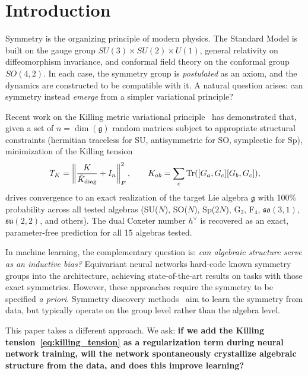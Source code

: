 \documentclass[11pt,a4paper]{article}
\newcommand{\fkg}{\mathfrak{g}}
\newcommand{\fksu}{\mathfrak{su}}
\newcommand{\fkso}{\mathfrak{so}}
\newcommand{\TK}{T_K}
\newcommand{\hdual}{h^{\vee}}
\theoremstyle{definition}
\begin{document}
\section{Introduction}
\label{sec:intro}

Symmetry is the organizing principle of modern physics. The Standard Model 
is built on the gauge group $SU(3) \times SU(2) \times U(1)$, general 
relativity on diffeomorphism invariance, and conformal field theory on the 
conformal group $SO(4,2)$. In each case, the symmetry group is 
\emph{postulated} as an axiom, and the dynamics are constructed to be 
compatible with it. A natural question arises: can symmetry instead 
\emph{emerge} from a simpler variational principle?

Recent work on the Killing metric variational principle~\cite{moreno2026relational,moreno2026experimental} 
has demonstrated that, given a set of $n = \dim(\fkg)$ random matrices 
subject to appropriate structural constraints (hermitian traceless for SU, 
antisymmetric for SO, symplectic for Sp), minimization of the Killing tension
\begin{equation}
  \label{eq:killing_tension}
  \TK = \left\| \frac{K}{\bar{K}_{\mathrm{diag}}} + I_n \right\|_F^2,
  \qquad K_{ab} = \sum_c \Tr([G_a, G_c][G_b, G_c]),
\end{equation}
drives convergence to an exact realization of the target Lie algebra 
$\fkg$ with 100\% probability across all tested algebras (SU($N$), SO($N$), 
Sp($2N$), G$_2$, F$_4$, $\fkso(3,1)$, $\fksu(2,2)$, and others). The dual 
Coxeter number $\hdual$ is recovered as an exact, parameter-free prediction 
for all 15 algebras tested.

In machine learning, the complementary question is: \emph{can algebraic 
structure serve as an inductive bias?} Equivariant neural networks 
\cite{cohen2016group,bronstein2021geometric,weiler2019general,fuchs2020se3,thomas2018tensor} 
hard-code known symmetry groups into the architecture, achieving 
state-of-the-art results on tasks with those exact symmetries. However, 
these approaches require the symmetry to be specified \emph{a priori}. 
Symmetry discovery methods~\cite{dehmamy2021automatic,yang2023generative,ling2022symmetry} 
aim to learn the symmetry from data, but typically operate on the group level 
rather than the algebra level.

This paper takes a different approach. We ask: \textbf{if we add the Killing 
tension~\eqref{eq:killing_tension} as a regularization term during neural 
network training, will the network spontaneously crystallize algebraic 
structure from the data, and does this improve learning?}
\end{document}
